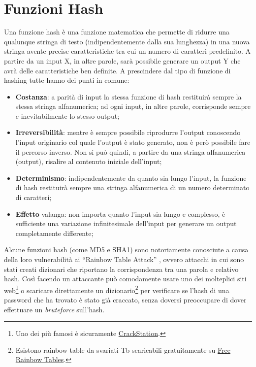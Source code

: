 \section{Funzioni Hash}

Una funzione hash è una funzione matematica che permette di ridurre una
qualunque stringa di
testo (indipendentemente dalla sua lunghezza) in una nuova stringa avente
precise caratteristiche
tra cui un numero di caratteri predefinito. A partire da un input X, in
altre parole, sarà possibile
generare un output Y che avrà delle caratteristiche ben definite.
A prescindere dal tipo di funzione di hashing tutte hanno dei punti in comune:

\begin{itemize}
    \item \textbf{Costanza}: a parità di input la stessa funzione di hash
          restituirà sempre la stessa stringa
          alfanumerica; ad ogni input, in altre parole, corrisponde sempre e
          inevitabilmente lo stesso
          output;
    \item \textbf{Irreversibilità}: mentre è sempre possibile riprodurre
          l'output conoscendo l'input originario
          col quale l'output è stato generato, non è però possibile fare
          il percorso inverso. Non si può
          quindi, a partire da una stringa alfanumerica (output), risalire al contenuto
          iniziale dell'input;
    \item \textbf{Determinismo}: indipendentemente da quanto sia lungo l'input,
          la funzione di hash restituirà
          sempre una stringa alfanumerica di un numero determinato di caratteri;
    \item \textbf{Effetto} valanga: non importa quanto l'input sia lungo e
          complesso, è sufficiente una
          variazione infinitesimale dell'input per generare un output
          completamente differente;
\end{itemize}

Alcune funzioni hash (come MD5 e SHA1) sono notoriamente conosciute a causa della loro vulnerabilità ai ``Rainbow  Table Attack'' , ovvero attacchi in cui sono stati creati dizionari che riportano la corrispondenza tra una parola e relativo hash. Così facendo un attaccante può comodamente usare uno dei molteplici siti web\footnote{Uno dei più famosi è sicuramente \href{https://crackstation.net/}{CrackStation}.} o scaricare direttamente un dizionario\footnote{Esistono rainbow table da svariati Tb scaricabili gratuitamente su \href{https://freerainbowtables.com/}{Free Rainbow Tables}.} per verificare se l'hash di una password che ha trovato è stato già craccato, senza doversi preoccupare di dover effettuare un \emph{bruteforce} sull'hash.